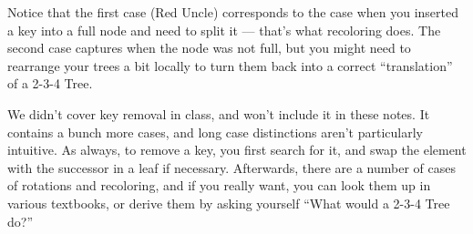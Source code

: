 Notice that the first case (Red Uncle) corresponds to the case when
you inserted a key into a full node and need to split it --- that's
what recoloring does. The second case captures when the node was not
full, but you might need to rearrange your trees a bit locally to turn
them back into a correct ``translation'' of a 2-3-4 Tree.

We didn't cover key removal in class, and won't include it in these
notes. It contains a bunch more cases, and long case distinctions
aren't particularly intuitive.
As always, to remove a key, you first search for it,
and swap the element with the successor in a leaf if necessary.
Afterwards, there are a number of cases of rotations and recoloring,
and if you really want, you can look them up in various textbooks, or
derive them by asking yourself ``What would a 2-3-4 Tree do?''

